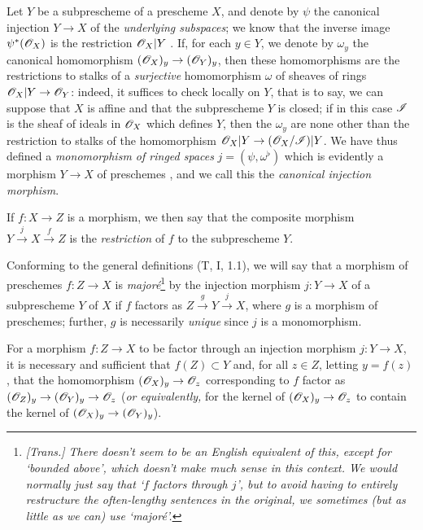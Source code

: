 \begin{env}[4.1.7]
\label{1.4.1.7}
Let $Y$ be a subprescheme of a prescheme $X$, and denote by $\psi$ the canonical injection $Y\to X$ of the \emph{underlying subspaces};
we know that the inverse image $\psi^*(\mathscr{O}_X)$ is the restriction $\mathscr{O}_X|Y$ .
If, for each $y\in Y$, we denote by $\omega_y$ the canonical homomorphism $(\OO_X)_y\to(\OO_Y)_y$, then these homomorphisms are the restrictions to stalks of a \emph{surjective} homomorphism $\omega$ of sheaves of rings $\OO_X|Y\to\OO_Y$: indeed, it suffices to check locally on $Y$, that is to say, we can suppose that $X$ is affine and that the subprescheme $Y$ is closed; if in this case $\mathscr{I}$ is the sheaf of ideals in $\mathscr{O}_X$ which defines $Y$, then the $\omega_y$ are none other than the restriction to stalks of the homomorphism $\OO_X|Y\to(\OO_X/\sh{I})|Y$.
We have thus defined a \emph{monomorphism of ringed spaces}  $j=(\psi,\omega^\flat)$ which is evidently a morphism $Y\to X$ of preschemes , and we call this the \emph{canonical injection morphism}.

If $f:X\to Z$ is a morphism, we then say that the composite morphism $Y\xrightarrow{j}X\xrightarrow{f}Z$ is the \emph{restriction} of $f$ to the subprescheme $Y$.
\end{env}

\begin{env}[4.1.8]
\label{1.4.1.8}
Conforming to the general definitions (T, I, 1.1), we will say that a morphism of preschemes $f:Z\to X$ is \emph{majoré}\footnote{\emph{[Trans.] There doesn't seem to be an English equivalent of this, except for `bounded above', which doesn't make much sense in this context. We would normally just say that `$f$ factors through $j$', but to avoid having to entirely restructure the often-lengthy sentences in the original, we sometimes (but as little as we can) use `majoré'.}} by the injection morphism $j:Y\to X$ of a subprescheme $Y$ of $X$ if $f$ factors as $Z\xrightarrow{g}Y\xrightarrow{j}X$, where $g$ is a morphism of preschemes;
further, $g$ is necessarily \emph{unique} since $j$ is a monomorphism.
\end{env}

\begin{prop}[4.1.9]
\label{1.4.1.9}
For a morphism $f:Z\to X$ to be factor through an injection morphism $j:Y\to X$, it is necessary and sufficient that $f(Z)\subset Y$ and, for all $z\in Z$, letting $y=f(z)$, that the homomorphism $(\OO_X)_y\to\OO_z$ corresponding to $f$ factor as $(\OO_Z)_y\to(\OO_Y)_y\to\OO_z$ (\emph{or equivalently,} for the kernel of $(\OO_X)_y\to\OO_z$ to contain the kernel of $(\OO_X)_y\to(\OO_Y)_y$).
\end{prop}

